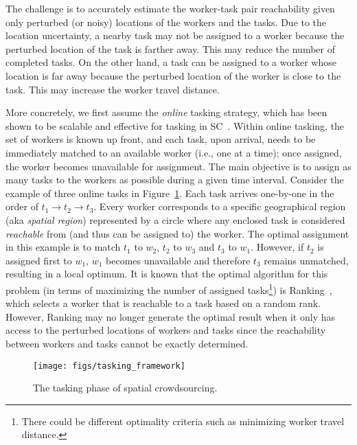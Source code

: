 \documentclass{USC-Thesis}
\numberwithin{equation}{chapter}
\begin{document}
The challenge is to accurately estimate the worker-task pair reachability given only perturbed (or noisy) locations of the workers and the tasks. Due to the location uncertainty, a nearby task may not be assigned to a worker because the perturbed location of the task is farther away. This may reduce the number of completed tasks. On the other hand, a task can be assigned to a worker whose location is far away because the perturbed location of the worker is close to the task. This may increase the worker travel distance.

More concretely, we first assume the \emph{online} tasking strategy, which has been shown to be scalable and effective for tasking in SC~\cite{asghari2016price,tong2016online,tong2016vldb}. Within online tasking, the set of workers is known up front, and each task, upon arrival, needs to be immediately matched to an available worker (i.e., one at a time); once assigned, the worker becomes unavailable for assignment. The main objective is to assign as many tasks to the workers as possible during a given time interval. Consider the example of three online tasks in Figure~\ref{fig:tasking_framework}. Each task arrives one-by-one in the order of $t_1\rightarrow t_2\rightarrow t_3$. Every worker corresponds to a specific geographical region (aka \emph{spatial region}) represented by a circle where any enclosed task is considered \emph{reachable} from (and thus can be assigned to) the worker. The optimal assignment in this example is to match $t_1$ to $w_2$, $t_2$ to $w_3$ and $t_3$ to $w_1$. However, if $t_2$ is assigned first to $w_1$, $w_1$ becomes unavailable and therefore $t_3$ remains unmatched, resulting in a local optimum. It is known that the optimal algorithm for this problem (in terms of maximizing the number of assigned tasks\footnote{There could be different optimality criteria such as minimizing worker travel distance.}) is Ranking~\cite{karp1990optimal}, which selects a worker that is reachable to a task based on a random rank. However, Ranking may no longer generate the optimal result when it only has access to the perturbed locations of workers and tasks since the reachability between workers and tasks cannot be exactly determined.

\begin{figure}[ht]
		\centering
		\texttt{[image: figs/tasking\_framework]}
	\caption{The tasking phase of spatial crowdsourcing.}
	\label{fig:tasking_framework}
\end{figure}
\end{document}
